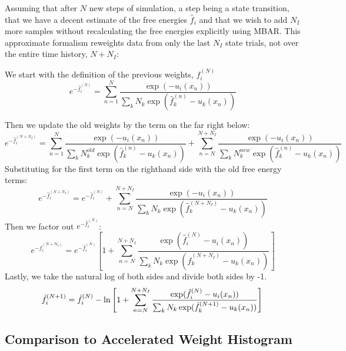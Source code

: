 \documentclass[superscriptaddress,showkeys, nofootinbib, pre, aps]{revtex4-1}
\begin{document}
Assuming that after $N$ new steps of simulation, a step being a state transition, that we have a decent estimate of the free energies $\hat{f}_{i}$ and that we wish to add $N_I$ more samples without recalculating the free energies explicitly using MBAR. This approximate formalism reweights data from only the last $N_I$ state trials, not over the entire time history, $N+N_I$:

We start with the definition of the previous weights, $f_{i}^{(N)}$
\begin{equation}
e^{-\hat{f}_{i}^{(N)}} = \sum_{n=1}^N \frac{\exp(-u_i(x_n))}{\sum\limits_k N_k \exp(\hat{f}_{k}^{(n)}-u_k(x_n))}
\end{equation}

Then we update the old weights by the term on the far right below:
\begin{equation}
e^{-\hat{f}_{i}^{(N+N_I)}} = \sum_{n=1}^N \frac{\exp(-u_i(x_n))}{\sum\limits_k N_k^{old} \exp(\hat{f}_{k}^{(n)}-u_k(x_n))} +
                           \sum_{n=N}^{N+N_I} \frac{\exp(-u_i(x_{n}))}{\sum\limits_k N_k^{new} \exp(\hat{f}_{k}^{(n)}-u_k(x_{n}))}
\end{equation}
Substituting for the first term on the righthand side with the old free energy terms:
\begin{equation}
e^{-\hat{f}_{i}^{(N+N_I)}} = e^{-\hat{f}_{i}^{(N)}} + \sum_{n=N}^{N+N_I}\frac{\exp(-u_i(x_{n}))}{\sum_k N_k \exp(\hat{f}_{k}^{(N+N_I)}-u_k(x_{n}))}
\end{equation}
Then we factor out $e^{-\hat{f}_{i}^{(N)}}$:
\begin{equation}
e^{-\hat{f}_{i}^{(N+N_I)}} = e^{-\hat{f}_{i}^{(N)}} \left[1 + \sum_{n=N}^{N+N_I} \frac{\exp(\hat{f}_{i}^{(N)}-u_i(x_{n}))}{\sum_k N_k \exp(\hat{f}_{k}^{(N+N_I)}-u_k(x_{n}))}\right]
\end{equation}
Lastly, we take the natural log of both sides and divide both sides by -1.
\begin{equation}
\hat{f}_{i}^{(N+1)} = \hat{f}_{i}^{(N)} - \ln\left[1 + \sum_{n=N}^{N+N_I} \frac{\exp(\hat{f}_{i}^{(N)}-u_i(x_{n}))}{\sum_k N_k \exp(\hat{f}_{k}^{(N+1)}-u_k(x_{n}))}\right] \nonumber \\
\end{equation}
\fi

\subsection{\label{sec:wwl}Comparison to Accelerated Weight Histogram}
\end{document}
